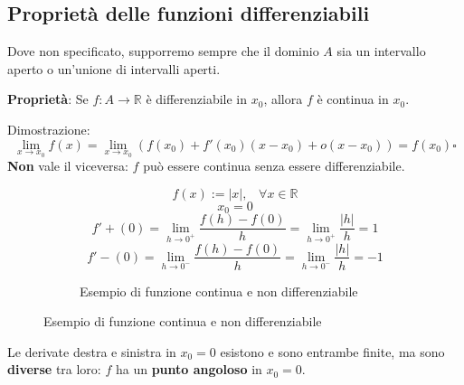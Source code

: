 \documentclass[a4paper]{article}
\theoremstyle{break}
\theoremstyle{break}
\theoremstyle{break}
\theoremstyle{break}
\begin{document}
\subsection{Proprietà delle funzioni differenziabili}
Dove non specificato, supporremo sempre che il dominio \( A \)  sia un intervallo
aperto o un'unione di intervalli aperti.

\textbf{Proprietà}: Se \( f:A \to \mathbb{R} \) è differenziabile in \( x_0 \), allora
\( f \) è continua in \( x_0 \).

Dimostrazione:
\[
  \lim_{x \to x_0} f(x) = \lim_{x \to x_0} (f(x_0)+f'(x_0)(x-x_0)+o(x-x_0)) = f(x_0) \square
\]
\textbf{Non} vale il viceversa: \( f \) può essere continua senza essere differenziabile.
\begin{figure}[H]
  \begin{example}
    \[
      f(x):= |x|,\;\;\; \forall x \in \mathbb{R}
    \]
    \[
      x_0 = 0
    \]
    \[
      f'+(0)=\lim_{h \to 0^+} \frac{f(h)-f(0)}{h} = \lim_{h \to 0^+} \frac{|h|}{h} = 1
    \]
    \[
      f'-(0)=\lim_{h \to 0^-} \frac{f(h)-f(0)}{h} = \lim_{h \to 0^-} \frac{|h|}{h} = -1
    \]
    \begin{figure}[H]
      \begin{center}
      \end{center}
      \caption{Esempio di funzione continua e non differenziabile}
    \end{figure}

  \end{example}
\end{figure}
Le derivate destra e sinistra in \( x_0 = 0 \) esistono e sono entrambe finite, ma sono
\textbf{diverse} tra loro: \( f \) ha un \textbf{punto angoloso} in \( x_0=0 \).
\end{document}
